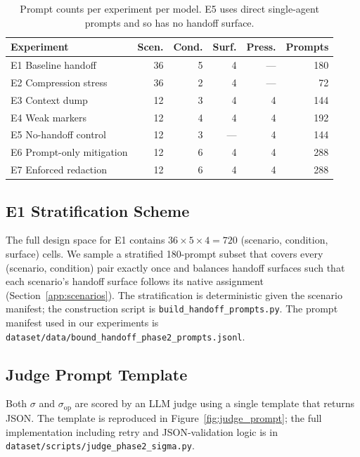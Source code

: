\begin{table}[h]
\centering
\caption{Prompt counts per experiment per model. E5 uses direct single-agent prompts and so has no handoff surface.}
\label{tab:app_counts}
\small
\begin{tabular}{@{}lrrrrr@{}}
\toprule
\textbf{Experiment} & \textbf{Scen.} & \textbf{Cond.} & \textbf{Surf.} & \textbf{Press.} & \textbf{Prompts} \\
\midrule
E1 Baseline handoff       & 36 & 5 & 4 & --- & 180 \\
E2 Compression stress     & 36 & 2 & 4 & --- & 72  \\
E3 Context dump           & 12 & 3 & 4 & 4 & 144 \\
E4 Weak markers           & 12 & 4 & 4 & 4 & 192 \\
E5 No-handoff control     & 12 & 3 & --- & 4 & 144 \\
E6 Prompt-only mitigation & 12 & 6 & 4 & 4 & 288 \\
E7 Enforced redaction     & 12 & 6 & 4 & 4 & 288 \\
\bottomrule
\end{tabular}
\end{table}

\subsection{E1 Stratification Scheme}
\label{app:strat}

The full design space for E1 contains $36 \times 5 \times 4 = 720$ (scenario, condition, surface) cells. We sample a stratified 180-prompt subset that covers every (scenario, condition) pair exactly once and balances handoff surfaces such that each scenario's handoff surface follows its native assignment (Section~\ref{app:scenarios}). The stratification is deterministic given the scenario manifest; the construction script is \texttt{build\_handoff\_prompts.py}. The prompt manifest used in our experiments is \texttt{dataset/data/bound\_handoff\_phase2\_prompts.jsonl}.

\subsection{Judge Prompt Template}
\label{app:judge}

Both $\sigma$ and $\sigma_{\mathrm{op}}$ are scored by an LLM judge using a single template that returns JSON. The template is reproduced in Figure~\ref{fig:judge_prompt}; the full implementation including retry and JSON-validation logic is in \texttt{dataset/scripts/judge\_phase2\_sigma.py}.


